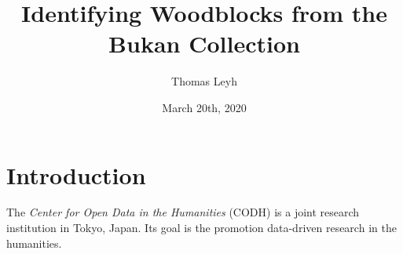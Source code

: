 \documentclass{scrreprt}
\title{Identifying Woodblocks from the Bukan Collection}
\author{Thomas Leyh}
\date{March 20th, 2020}
\begin{document}
\maketitle

\tableofcontents

\chapter{Introduction}

The \emph{Center for Open Data in the Humanities} (CODH) is a joint research institution in Tokyo, Japan. Its goal is the promotion data-driven research in the humanities.\cite{kitamoto2017codh}
\end{document}
